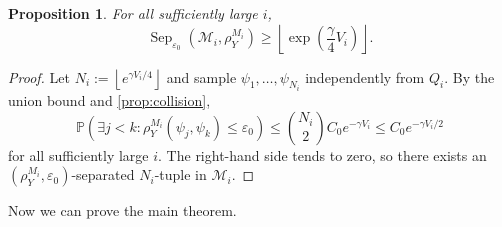 \documentclass[12pt]{amsart}
\newtheorem{proposition}[proposition]{Proposition}
\theoremstyle{definition}
\newcommand{\Sep}{\operatorname{Sep}}
\newcommand{\1}{\mathbf 1}
\newcommand{\eps}{\varepsilon}
\begin{document}
\begin{proposition}\label{prop:packing}
For all sufficiently large $i$,
\[
 \Sep_{\eps_0}(\mathscr M_i,\rho_Y^{M_i})
 \geq \left\lfloor\exp\left(\frac\gamma4V_i\right)\right\rfloor.
\]
\end{proposition}

\begin{proof}
Let
$
 N_i:=\left\lfloor e^{\gamma V_i/4}\right\rfloor
$
and sample $\psi_1,\dots,\psi_{N_i}$ independently from $Q_i$. By the union bound and \cref{prop:collision},
\[
 \mathbb P\left(\exists j<k:\rho_Y^{M_i}(\psi_j,\psi_k)\leq\eps_0\right)
 \leq \binom{N_i}{2}C_0e^{-\gamma V_i}
 \leq C_0e^{-\gamma V_i/2}
\]
for all sufficiently large $i$. The right-hand side tends to zero, so there exists an $(\rho_Y^{M_i},\eps_0)$-separated $N_i$-tuple in $\mathscr M_i$.
\end{proof}

Now we can prove  the main theorem.
\end{document}
